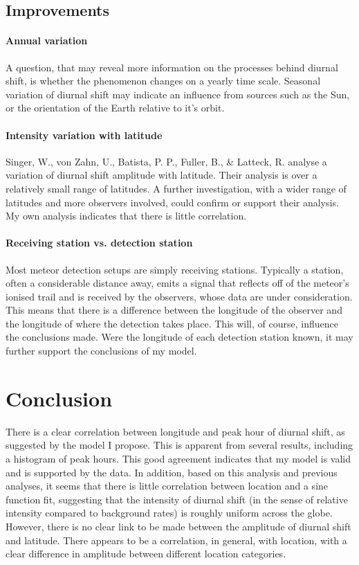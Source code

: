 \subsection{Improvements}
\paragraph{Annual variation\\}
A question, that may reveal more information on the processes behind diurnal shift, is whether the phenomenon changes on a yearly time scale. Seasonal variation of diurnal shift may indicate an influence from sources such as the Sun, or the orientation of the Earth relative to it's orbit.
\paragraph{Intensity variation with latitude\\}
Singer, W., von Zahn, U., Batista, P. P., Fuller, B., \& Latteck, R. \cite{latitudes} analyse a variation of diurnal shift amplitude with latitude. Their analysis is over a relatively small range of latitudes. A further investigation, with a wider range of latitudes and more observers involved, could confirm or support their analysis. My own analysis indicates that there is little correlation.
\paragraph{Receiving station vs. detection station}
Most meteor detection setups are simply receiving stations. Typically a station, often a considerable distance away, emits a signal that reflects off of the meteor's ionised trail and is received by the observers, whose data are under consideration. This means that there is a difference between the longitude of the observer and the longitude of where the detection takes place. This will, of course, influence the conclusions made. Were the longitude of each detection station known, it may further support the conclusions of my model.
\section{Conclusion}
There is a clear correlation between longitude and peak hour of diurnal shift, as suggested by the model I propose. This is apparent from several results, including a histogram of peak hours. This good agreement indicates that my model is valid and is supported by the data. In addition, based on this analysis and previous analyses, it seems that there is little correlation between location and a sine function fit, suggesting that the intensity of diurnal shift (in the sense of relative intensity compared to background rates) is roughly uniform across the globe. However, there is no clear link to be made between the amplitude of diurnal shift and latitude. There appears to be a correlation, in general, with location, with a clear difference in amplitude between different location categories.